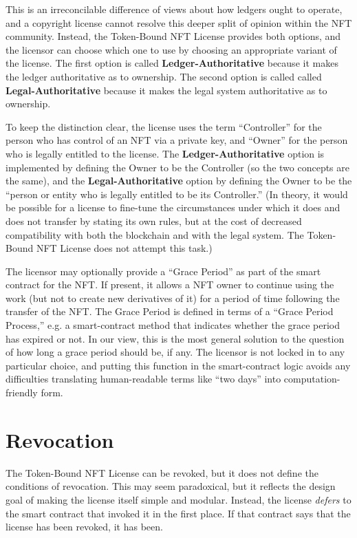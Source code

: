 \documentclass{article}
\newcommand{\iccclicense}{Token-Bound NFT License\xspace}
\newcommand{\keyword}[1]{\textbf{#1}\xspace}
\newcommand{\ledger}{\keyword{Ledger-Authoritative}}
\newcommand{\legal}{\keyword{Legal-Authoritative}}
\begin{document}
This is an irreconcilable difference of views about how ledgers ought to operate, and a copyright license cannot resolve this deeper split of opinion within the NFT community. Instead, the \iccclicense provides both options, and the licensor can choose which one to use by choosing an appropriate variant of the license. The first option is called \ledger because it makes the ledger authoritative as to ownership. The second option is called called \legal because it makes the legal system authoritative as to ownership.
 
To keep the distinction clear, the license uses the term ``Controller'' for the person who has control of an NFT via a private key, and ``Owner'' for the person who is legally entitled to the license. The \ledger option is implemented by defining the Owner to be the Controller (so the two concepts are the same), and the \legal option by defining the Owner to be the ``person or entity who is legally entitled to be its Controller.'' (In theory, it would be possible for a license to fine-tune the circumstances under which it does and does not transfer by stating its own rules, but at the cost of decreased compatibility with both the blockchain and with the legal system. The \iccclicense does not attempt this task.)

The licensor may optionally provide a ``Grace Period'' as part of the smart contract for the NFT. If present, it allows a NFT owner to continue using the work (but not to create new derivatives of it) for a period of time following the transfer of the NFT. The Grace Period is defined in terms of a ``Grace Period Process,'' e.g. a smart-contract method that indicates whether the grace period has expired or not. In our view, this is the most general solution to the question of how long a grace period should be, if any. The licensor is not locked in to any particular choice, and putting this function in the smart-contract logic avoids any difficulties translating human-readable terms like ``two days'' into computation-friendly form.

\section{Revocation}

The \iccclicense can be revoked, but it does not define the conditions of revocation. This may seem paradoxical, but it reflects the design goal of making the license itself simple and modular. Instead, the license \emph{defers} to the smart contract that invoked it in the first place. If that contract says that the license has been revoked, it has been. 
\end{document}
